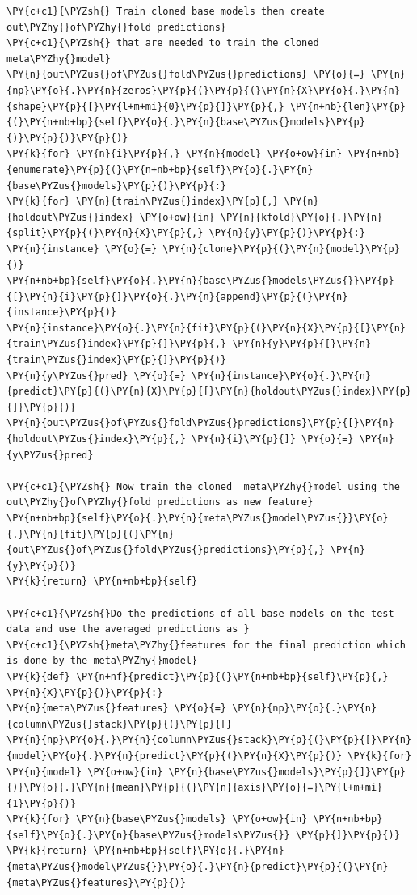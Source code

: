 \documentclass[no-math]{YangThesis}
\begin{document}
\begin{tcolorbox}[breakable, size=fbox, boxrule=1pt, pad at break*=1mm,colback=cellbackground, colframe=cellborder]
\begin{Verbatim}[commandchars=\\\{\}]
\PY{c+c1}{\PYZsh{} Train cloned base models then create out\PYZhy{}of\PYZhy{}fold predictions}
\PY{c+c1}{\PYZsh{} that are needed to train the cloned meta\PYZhy{}model}
\PY{n}{out\PYZus{}of\PYZus{}fold\PYZus{}predictions} \PY{o}{=} \PY{n}{np}\PY{o}{.}\PY{n}{zeros}\PY{p}{(}\PY{p}{(}\PY{n}{X}\PY{o}{.}\PY{n}{shape}\PY{p}{[}\PY{l+m+mi}{0}\PY{p}{]}\PY{p}{,} \PY{n+nb}{len}\PY{p}{(}\PY{n+nb+bp}{self}\PY{o}{.}\PY{n}{base\PYZus{}models}\PY{p}{)}\PY{p}{)}\PY{p}{)}
\PY{k}{for} \PY{n}{i}\PY{p}{,} \PY{n}{model} \PY{o+ow}{in} \PY{n+nb}{enumerate}\PY{p}{(}\PY{n+nb+bp}{self}\PY{o}{.}\PY{n}{base\PYZus{}models}\PY{p}{)}\PY{p}{:}
\PY{k}{for} \PY{n}{train\PYZus{}index}\PY{p}{,} \PY{n}{holdout\PYZus{}index} \PY{o+ow}{in} \PY{n}{kfold}\PY{o}{.}\PY{n}{split}\PY{p}{(}\PY{n}{X}\PY{p}{,} \PY{n}{y}\PY{p}{)}\PY{p}{:}
\PY{n}{instance} \PY{o}{=} \PY{n}{clone}\PY{p}{(}\PY{n}{model}\PY{p}{)}
\PY{n+nb+bp}{self}\PY{o}{.}\PY{n}{base\PYZus{}models\PYZus{}}\PY{p}{[}\PY{n}{i}\PY{p}{]}\PY{o}{.}\PY{n}{append}\PY{p}{(}\PY{n}{instance}\PY{p}{)}
\PY{n}{instance}\PY{o}{.}\PY{n}{fit}\PY{p}{(}\PY{n}{X}\PY{p}{[}\PY{n}{train\PYZus{}index}\PY{p}{]}\PY{p}{,} \PY{n}{y}\PY{p}{[}\PY{n}{train\PYZus{}index}\PY{p}{]}\PY{p}{)}
\PY{n}{y\PYZus{}pred} \PY{o}{=} \PY{n}{instance}\PY{o}{.}\PY{n}{predict}\PY{p}{(}\PY{n}{X}\PY{p}{[}\PY{n}{holdout\PYZus{}index}\PY{p}{]}\PY{p}{)}
\PY{n}{out\PYZus{}of\PYZus{}fold\PYZus{}predictions}\PY{p}{[}\PY{n}{holdout\PYZus{}index}\PY{p}{,} \PY{n}{i}\PY{p}{]} \PY{o}{=} \PY{n}{y\PYZus{}pred}

\PY{c+c1}{\PYZsh{} Now train the cloned  meta\PYZhy{}model using the out\PYZhy{}of\PYZhy{}fold predictions as new feature}
\PY{n+nb+bp}{self}\PY{o}{.}\PY{n}{meta\PYZus{}model\PYZus{}}\PY{o}{.}\PY{n}{fit}\PY{p}{(}\PY{n}{out\PYZus{}of\PYZus{}fold\PYZus{}predictions}\PY{p}{,} \PY{n}{y}\PY{p}{)}
\PY{k}{return} \PY{n+nb+bp}{self}

\PY{c+c1}{\PYZsh{}Do the predictions of all base models on the test data and use the averaged predictions as }
\PY{c+c1}{\PYZsh{}meta\PYZhy{}features for the final prediction which is done by the meta\PYZhy{}model}
\PY{k}{def} \PY{n+nf}{predict}\PY{p}{(}\PY{n+nb+bp}{self}\PY{p}{,} \PY{n}{X}\PY{p}{)}\PY{p}{:}
\PY{n}{meta\PYZus{}features} \PY{o}{=} \PY{n}{np}\PY{o}{.}\PY{n}{column\PYZus{}stack}\PY{p}{(}\PY{p}{[}
\PY{n}{np}\PY{o}{.}\PY{n}{column\PYZus{}stack}\PY{p}{(}\PY{p}{[}\PY{n}{model}\PY{o}{.}\PY{n}{predict}\PY{p}{(}\PY{n}{X}\PY{p}{)} \PY{k}{for} \PY{n}{model} \PY{o+ow}{in} \PY{n}{base\PYZus{}models}\PY{p}{]}\PY{p}{)}\PY{o}{.}\PY{n}{mean}\PY{p}{(}\PY{n}{axis}\PY{o}{=}\PY{l+m+mi}{1}\PY{p}{)}
\PY{k}{for} \PY{n}{base\PYZus{}models} \PY{o+ow}{in} \PY{n+nb+bp}{self}\PY{o}{.}\PY{n}{base\PYZus{}models\PYZus{}} \PY{p}{]}\PY{p}{)}
\PY{k}{return} \PY{n+nb+bp}{self}\PY{o}{.}\PY{n}{meta\PYZus{}model\PYZus{}}\PY{o}{.}\PY{n}{predict}\PY{p}{(}\PY{n}{meta\PYZus{}features}\PY{p}{)}
	\end{Verbatim}
\end{tcolorbox}
\end{document}
